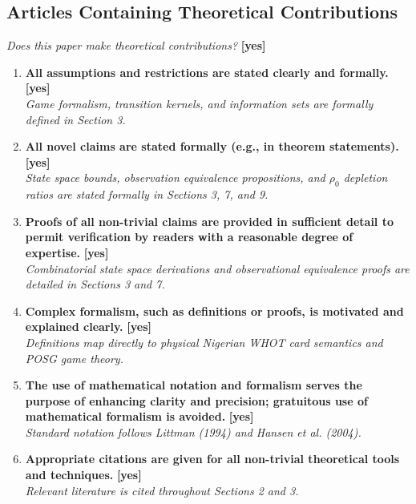 \documentclass[11pt]{article}
\begin{document}
\subsection*{Articles Containing Theoretical Contributions}
\textit{Does this paper make theoretical contributions?} \hfill \textbf{[yes]}
\begin{enumerate}
  \item \textbf{All assumptions and restrictions are stated clearly and formally.} \hfill \textbf{[yes]} \\
  \textit{Game formalism, transition kernels, and information sets are formally defined in Section 3.}
  \item \textbf{All novel claims are stated formally (e.g., in theorem statements).} \hfill \textbf{[yes]} \\
  \textit{State space bounds, observation equivalence propositions, and $\rho_0$ depletion ratios are stated formally in Sections 3, 7, and 9.}
  \item \textbf{Proofs of all non-trivial claims are provided in sufficient detail to permit verification by readers with a reasonable degree of expertise.} \hfill \textbf{[yes]} \\
  \textit{Combinatorial state space derivations and observational equivalence proofs are detailed in Sections 3 and 7.}
  \item \textbf{Complex formalism, such as definitions or proofs, is motivated and explained clearly.} \hfill \textbf{[yes]} \\
  \textit{Definitions map directly to physical Nigerian WHOT card semantics and POSG game theory.}
  \item \textbf{The use of mathematical notation and formalism serves the purpose of enhancing clarity and precision; gratuitous use of mathematical formalism is avoided.} \hfill \textbf{[yes]} \\
  \textit{Standard notation follows Littman (1994) and Hansen et al. (2004).}
  \item \textbf{Appropriate citations are given for all non-trivial theoretical tools and techniques.} \hfill \textbf{[yes]} \\
  \textit{Relevant literature is cited throughout Sections 2 and 3.}
\end{enumerate}
\end{document}
